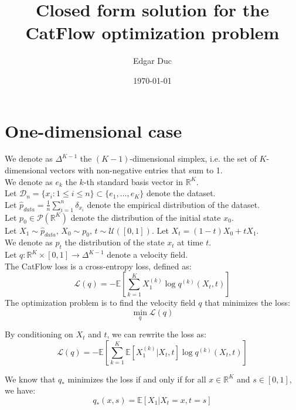 \documentclass{article}
\title{Closed form solution for the CatFlow optimization problem}
\author{Edgar Duc}
\date{\today}
\begin{document}
\maketitle

\section{One-dimensional case}
We denote as $\Delta^{K-1}$ the $(K-1)$-dimensional simplex, i.e. the set of $K$-dimensional vectors with non-negative entries that sum to 1. \\
We denote as $e_k$ the $k$-th standard basis vector in $\mathbb{R}^K$. \\
Let $\mathcal{D}_n = \{ x_i : 1 \leq i \leq n \} \subset \{e_1, \ldots, e_K\}$  denote the dataset.  \\
Let $\hat{p}_{data} = \frac{1}{n} \sum_{i=1}^n \delta_{x_i}$ denote the empirical distribution of the dataset. \\
Let $p_0 \in \mathcal{P}(\mathbb{R}^K)$ denote the distribution of the initial state $x_0$. \\

Let $X_1 \sim \hat{p}_{data}$, $X_0 \sim p_0$, $t \sim \mathcal{U}([0, 1])$.
Let $X_t = (1-t)X_0 + tX_1$.\\
We denote as $p_t$ the distribution of the state $x_t$ at time $t$. \\
Let $q : \mathbb{R}^K \times [0, 1] \to \Delta^{K-1}$ denote a velocity field. \\

The CatFlow loss is a cross-entropy loss, defined as:
\begin{equation}
    \mathcal{L}(q) = - \mathbb{E} \left[ \sum_{k=1}^{K} X_1^{(k)} \log q^{(k)}(X_t, t) \right]
\end{equation}
The optimization problem is to find the velocity field $q$ that minimizes the loss:
\begin{equation}
    \min_{q} \mathcal{L}(q)
\end{equation}

By conditioning on $X_t$ and $t$, we can rewrite the loss as:
\begin{equation}
    \mathcal{L}(q) = - \mathbb{E} \left[ \sum_{k=1}^{K} \mathbb{E}[X_1^{(k)} | X_t, t] \log q^{(k)}(X_t, t) \right]
\end{equation}

We know that $q_*$ minimizes the loss if and only if for all $x \in \mathbb{R}^K$ and $s \in [0, 1]$, we have:
\begin{equation}
    q_*(x, s) = \mathbb{E}[X_1 | X_t = x, t = s]
\end{equation}
\end{document}
